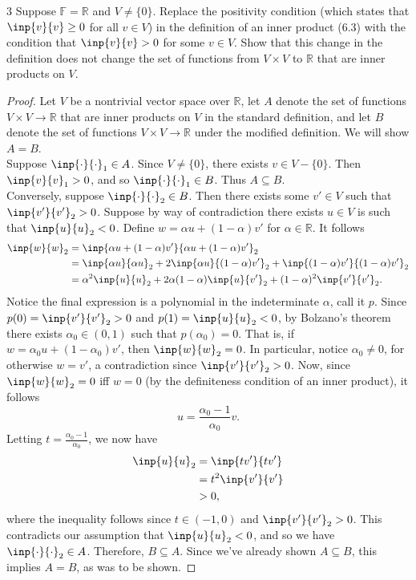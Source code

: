 \documentclass{extarticle}
\newenvironment{problem}[1]{\begin{prob*}{#1}{}}{\end{prob*}}
\newcommand{\R}{\mathbb{R}}
\newcommand{\F}{\mathbb{F}}
\begin{document}
\begin{problem}{3}
Suppose $\F=\R$ and $V\neq \{0\}$.  Replace the positivity condition (which states that $\inp{v}{v}\geq0$ for all $v\in V$) in the definition of an inner product (6.3) with the condition that $\inp{v}{v} > 0$ for some $v\in V$.  Show that this change in the definition does not change the set of functions from $V\times V$ to $\R$ that are inner products on $V$.
\end{problem}
\begin{proof}
Let $V$ be a nontrivial vector space over $\R$, let $A$ denote the set of functions $V\times V\to\R$ that are inner products on $V$ in the standard definition, and let $B$ denote the set of functions $V\times V\to \R$ under the modified definition.  We will show $A = B$.\\
\indent Suppose $\inp{\cdot}{\cdot}_1\in A$.  Since $V\neq\{0\}$, there exists $v\in V-\{0\}$.  Then $\inp{v}{v}_1>0$, and so $\inp{\cdot}{\cdot}_1\in B$.  Thus $A\subseteq B$.\\ 
\indent Conversely, suppose $\inp{\cdot}{\cdot}_2 \in B$.  Then there exists some $v'\in V$ such that $\inp{v'}{v'}_2 > 0$.  Suppose by way of contradiction there exists $u\in V$ is such that $\inp{u}{u}_2 < 0$.  Define $w = \alpha u + (1- \alpha) v'$ for $\alpha\in\R$.  It follows
\begin{align*}
\inp{w}{w}_2 &= \inp{\alpha u + (1- \alpha) v'}{\alpha u + (1- \alpha) v'}_2\\
&= \inp{\alpha u}{\alpha u}_2 + 2\inp{\alpha u}{(1 - \alpha)v'}_2 + \inp{(1 - \alpha)v'}{(1 - \alpha)v'}_2\\
&= \alpha^2\inp{u}{u}_2 + 2\alpha(1-\alpha)\inp{u}{v'}_2 + (1-\alpha)^2\inp{v'}{v'}_2.
\end{align*}
Notice the final expression is a polynomial in the indeterminate $\alpha$, call it $p$.  Since $p(0) = \inp{v'}{v'}_2 > 0$ and $p(1) = \inp{u}{u}_2 < 0$, by Bolzano's theorem there exists $\alpha_0\in(0, 1)$ such that $p(\alpha_0) = 0$.  That is, if $ w = \alpha_0u + (1 - \alpha_0)v'$, then $\inp{w}{w}_2 = 0$.  In particular, notice $\alpha_0\neq 0$, for otherwise $w = v'$, a contradiction since $\inp{v'}{v'}_2 > 0$.  Now, since $\inp{w}{w}_2 = 0$ iff $w = 0$ (by the definiteness condition of an inner product), it follows 
\begin{equation*}
u = \frac{\alpha_0 - 1}{\alpha_0} v.
\end{equation*}
Letting $t =  \frac{\alpha_0 - 1}{\alpha_0}$, we now have
\begin{align*}
\inp{u}{u}_2 &= \inp{tv'}{tv'}\\
&= t^2\inp{v'}{v'}\\
&> 0,
\end{align*}
where the inequality follows since $t\in(-1, 0)$ and $\inp{v'}{v'}_2 > 0$.  This contradicts our assumption that $\inp{u}{u}_2 < 0$, and so we have $\inp{\cdot}{\cdot}_2\in A$.  Therefore, $B\subseteq A$.  Since we've already shown $A\subseteq B$, this implies $A = B$, as was to be shown.
\end{proof}
\end{document}
